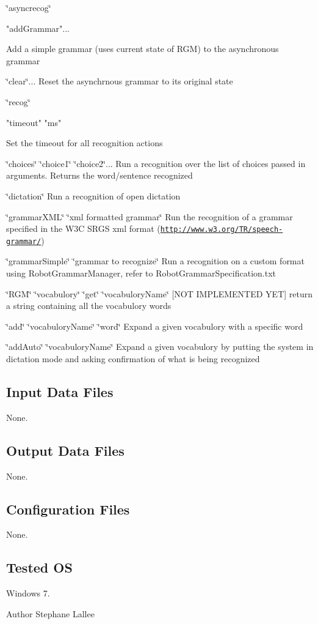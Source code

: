 \char`\"{}asyncrecog\char`\"{} \begin{DoxyVerb}"addGrammar"...
\end{DoxyVerb}
 Add a simple grammar (uses current state of R\+GM) to the asynchronous grammar

\char`\"{}clear\char`\"{}... Reset the asynchrnous grammar to its original state

\char`\"{}recog\char`\"{} \begin{DoxyVerb}"timeout" "ms"
\end{DoxyVerb}
 Set the timeout for all recognition actions

\char`\"{}choices\char`\"{} \char`\"{}choice1\char`\"{} \char`\"{}choice2\char`\"{}... Run a recognition over the list of choices passed in arguments. Returns the word/sentence recognized

\char`\"{}dictation\char`\"{} Run a recognition of open dictation

\char`\"{}grammar\+X\+M\+L\char`\"{} \char`\"{}xml formatted grammar\char`\"{} Run the recognition of a grammar specified in the W3C S\+R\+GS xml format (\href{http://www.w3.org/TR/speech-grammar/}{\tt http\+://www.\+w3.\+org/\+T\+R/speech-\/grammar/})

\char`\"{}grammar\+Simple\char`\"{} \char`\"{}grammar to recognize\char`\"{} Run a recognition on a custom format using Robot\+Grammar\+Manager, refer to Robot\+Grammar\+Specification.\+txt

\char`\"{}\+R\+G\+M\char`\"{} \char`\"{}vocabulory\char`\"{} \char`\"{}get\char`\"{} \char`\"{}vocabulory\+Name\char`\"{} \mbox{[}N\+OT I\+M\+P\+L\+E\+M\+E\+N\+T\+ED Y\+ET\mbox{]} return a string containing all the vocabulory words

\char`\"{}add\char`\"{} \char`\"{}vocabulory\+Name\char`\"{} \char`\"{}word\char`\"{} Expand a given vocabulory with a specific word

\char`\"{}add\+Auto\char`\"{} \char`\"{}vocabulory\+Name\char`\"{} Expand a given vocabulory by putting the system in dictation mode and asking confirmation of what is being recognized\hypertarget{group__windows-tts_in_files_sec}{}\subsection{Input Data Files}\label{group__windows-tts_in_files_sec}
None.\hypertarget{group__windows-tts_out_data_sec}{}\subsection{Output Data Files}\label{group__windows-tts_out_data_sec}
None.\hypertarget{group__windows-tts_conf_file_sec}{}\subsection{Configuration Files}\label{group__windows-tts_conf_file_sec}
None.\hypertarget{group__windows-tts_tested_os_sec}{}\subsection{Tested OS}\label{group__windows-tts_tested_os_sec}
Windows 7.

\begin{DoxyAuthor}{Author}
Stephane Lallee 
\end{DoxyAuthor}
